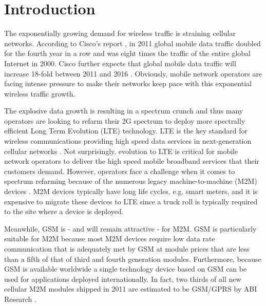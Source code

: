 \documentclass[10pt,journal]{IEEEtran}
\theoremstyle{slplain}
\begin{document}
\section{Introduction}



The exponentially growing demand for wireless traffic is straining cellular networks.  According to Cisco's report \cite{cisco2011cisco}, in 2011 global mobile data traffic doubled for the fourth year in a row and was eight times the traffic of the entire global Internet in 2000. Cisco further expects that global mobile data traffic will increase 18-fold between 2011 and 2016 \cite{cisco2011cisco}. Obviously, mobile network operators are facing intense pressure to make their networks keep pace with this exponential wireless traffic growth.

The explosive data growth is resulting in a spectrum crunch and thus many operators are looking to refarm their 2G spectrum to deploy more spectrally efficient Long Term Evolution (LTE) technology. LTE is the key standard for wireless communications providing high speed data services in next-generation cellular networks \cite{website:3gppLTE, Astely2009LTE, Ghosh2010Fundamentals}. Not surprisingly, evolution to LTE is critical for mobile network operators to deliver the high speed mobile broadband services that their customers demand. However, operators face a challenge when it comes to spectrum refarming because of the numerous legacy machine-to-machine (M2M) devices \cite{Vodafone2010M2M, Ericsson2011M2M}.  M2M devices typically have long life cycles, e.g. smart meters, and it is expensive to migrate these devices to LTE since a truck roll is typically required to the site where a device is deployed.

Meanwhile, GSM is - and will remain attractive - for M2M. GSM is particularly suitable for M2M because most M2M devices require low data rate communication that is adequately met by GSM at module prices that are less than a fifth of that of third and fourth generation modules. Furthermore, because GSM is available worldwide \cite{mehrotra1997gsm} a single technology device based on GSM can be used for applications deployed internationally. In fact, two thirds of all new cellular M2M modules shipped in 2011 are estimated to be GSM/GPRS by ABI Research \cite{GSMModules-ABI}.
\end{document}
